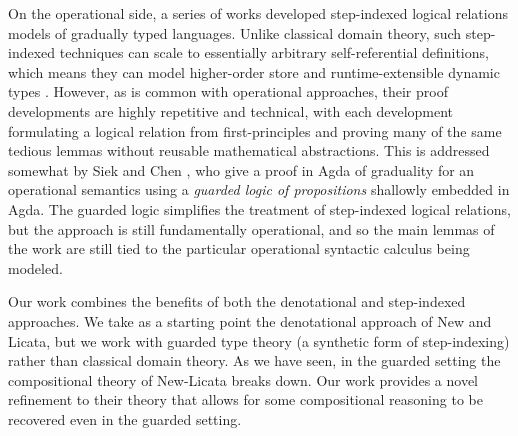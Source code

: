 On the operational side, a series of works
\cite{new-ahmed2018, new-licata-ahmed2019, new-jamner-ahmed19}
developed step-indexed logical relations models of gradually typed languages.
Unlike classical domain theory, such step-indexed techniques can scale to
essentially arbitrary self-referential definitions, which means they can model
higher-order store and runtime-extensible dynamic types
\cite{appelmcallester01,ahmed06,neis09,new-jamner-ahmed19}. However, as is
common with operational approaches, their proof developments are highly
repetitive and technical, with each development formulating a logical relation
from first-principles and proving many of the same tedious lemmas without
reusable mathematical abstractions.
%
%
%
This is addressed somewhat by Siek and Chen \cite{siek-chen2021}, who give a
proof in Agda of graduality for an operational semantics using a \emph{guarded
logic of propositions} shallowly embedded in Agda. The guarded logic simplifies
the treatment of step-indexed logical relations, but the approach is still
fundamentally operational, and so the main lemmas of the work are still tied to
the particular operational syntactic calculus being modeled.

Our work combines the benefits of both the denotational and step-indexed
approaches. We take as a starting point the denotational approach of New and
Licata, but we work with guarded type theory (a synthetic form of step-indexing)
rather than classical domain theory. As we have seen, in the guarded setting the compositional
theory of New-Licata breaks down. 
Our work provides a novel refinement to their theory that allows for some
compositional reasoning to be recovered even in the guarded setting.

